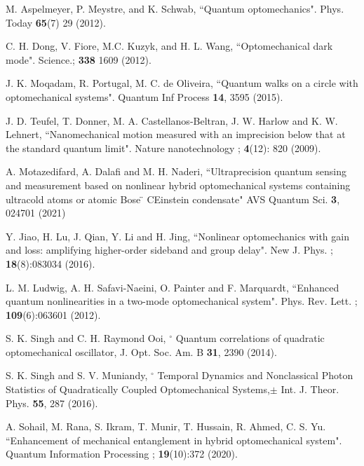 \documentclass[aps,pra,superscriptaddress,balancelastpage,twocolumn]{revtex4}
\begin{document}
\begin{thebibliography}{99}
 M. Aspelmeyer, P. Meystre, and K. Schwab, ``Quantum
optomechanics". Phys. Today \textbf{65}(7) 29 (2012).

 C. H. Dong, V. Fiore, M.C. Kuzyk, and H. L. Wang,
``Optomechanical dark mode". Science.; \textbf{338} 1609 (2012).

 J. K. Moqadam, R. Portugal, M. C. de Oliveira, ``Quantum
walks on a circle with optomechanical systems". Quantum Inf Process \textbf{%
14}, 3595 (2015).

 J. D. Teufel, T. Donner, M. A. Castellanos-Beltran, J. W.
Harlow and K. W. Lehnert, ``Nanomechanical motion measured with an
imprecision below that at the standard quantum limit". Nature nanotechnology
; \textbf{4}(12): 820 (2009).

 A. Motazedifard, A. Dalafi and M. H. Naderi, ``Ultraprecision
quantum sensing and measurement based on nonlinear hybrid optomechanical
systems containing ultracold atoms or atomic Bose%
\"{}%
CEinstein condensate" AVS Quantum Sci. \textbf{3}, 024701 (2021)

 Y. Jiao, H. Lu, J. Qian, Y. Li and H. Jing, ``Nonlinear
optomechanics with gain and loss: amplifying higher-order sideband and group
delay". New J. Phys. ; \textbf{18}(8):083034 (2016).

 L. M. Ludwig, A. H. Safavi-Naeini, O. Painter and F.
Marquardt, ``Enhanced quantum nonlinearities in a two-mode optomechanical
system". Phys. Rev. Lett. ; \textbf{109}(6):063601 (2012).

 S. K. Singh and C. H. Raymond Ooi, \textexclamdown
${{}^\circ}$%
Quantum correlations of quadratic optomechanical oscillator, J. Opt. Soc.
Am. B \textbf{31}, 2390 (2014).

 S. K. Singh and S. V. Muniandy, \textexclamdown
${{}^\circ}$%
Temporal Dynamics and Nonclassical Photon Statistics of Quadratically
Coupled Optomechanical Systems,\textexclamdown $\pm$ Int. J. Theor. Phys.
\textbf{55}, 287 (2016).

 A. Sohail, M. Rana, S. Ikram, T. Munir, T. Hussain, R. Ahmed,
C. S. Yu. ``Enhancement of mechanical entanglement in hybrid optomechanical
system". Quantum Information Processing ; \textbf{19}(10):372 (2020).


\end{thebibliography}
\end{document}
